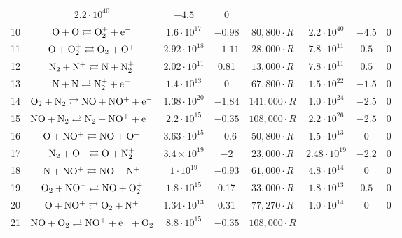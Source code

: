 \documentclass{warpdoc}
\begin{document}
\begin{table}[t]
\begin{center}
\begin{threeparttable}
\begin{tabular}{cccccccc}
                                          & $2.2 \cdot 10^{40}$  & $-4.5$  & 0\\
10 & $\rm O + O \rightleftarrows O_2^{+}+e^-$ & $1.6 \cdot 10^{17}$ & $-0.98$ & $80,800 \cdot R$ 
                                          & $2.2 \cdot 10^{40}$  & $-4.5$  & 0\\
11 & $\rm O + O_2^+ \rightleftarrows O_2+O^+$ & $2.92 \cdot 10^{18}$ & $-1.11$ & $28,000\cdot R$ 
                                          & $7.8 \cdot 10^{11}$  & $0.5$  & 0\\
12 & $\rm N_2 + N^+ \rightleftarrows N+N_2^{+}$ & $2.02 \cdot 10^{11}$ & 0.81 & $13,000 \cdot R$ 
                                          & $7.8 \cdot 10^{11}$  & $0.5$  & 0\\
13 & $\rm N + N \rightleftarrows N_2^{+} + e^-$ & $1.4 \cdot 10^{13}$ & 0 & $67,800\cdot R$ 
                                          & $1.5 \cdot 10^{22}$  & $-1.5$  & 0\\
14 & $\rm O_2 + N_2 \rightleftarrows NO + NO^+ + e^-$ & $1.38 \cdot 10^{20}$ & $-1.84$ & $141,000\cdot R$ 
                                          & $1.0 \cdot 10^{24}$  & $-2.5$  & 0\\
15 & $\rm NO + N_2 \rightleftarrows N_2 + NO^+ + e^-$ & $2.2 \cdot 10^{15}$ & $-0.35$ & $108,000\cdot R$ 
                                          & $2.2 \cdot 10^{26}$  & $-2.5$  & 0\\
16 & $\rm O + NO^+ \rightleftarrows NO + O^+$ & $3.63 \cdot 10^{15}$ & $-0.6$ & $50,800\cdot R$ 
                                          & $1.5 \cdot 10^{13}$  & $0$  & 0\\
17 & $\rm N_2 + O^+ \rightleftarrows O + N_2^{+}$ & $3.4 \times 10^{19}$ & $-2$ & $23,000\cdot R$ 
                                          & $2.48 \cdot 10^{19}$  & $-2.2$  & 0\\
18 & $\rm N + NO^+ \rightleftarrows NO + N^+$ & $1 \cdot 10^{19}$ & $-0.93$ & $61,000\cdot R$ 
                                          & $4.8 \cdot 10^{14}$  & $0$  & 0\\
19 & $\rm O_2 + NO^+ \rightleftarrows NO + O_2^{+}$ & $1.8 \cdot 10^{15}$ & 0.17 & $33,000\cdot R$ 
                                          & $1.8 \cdot 10^{13}$  & $0.5$  & 0\\
20 & $\rm O + NO^+ \rightleftarrows O_2 + N^+$ & $1.34 \cdot 10^{13}$ & 0.31 & $77,270\cdot R$ 
                                          & $1.0 \cdot 10^{14}$  & $0$  & 0\\
21 & $\rm NO + O_2 \rightleftarrows NO^+ + e^- + O_2$ & $8.8 \cdot 10^{15}$ & $-0.35$ & $108,000\cdot R$ 

\end{tabular}
\end{threeparttable}
\end{center}
\end{table}
\end{document}
